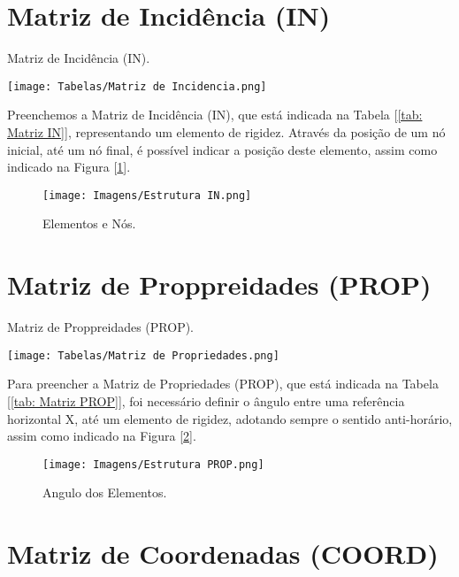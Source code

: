 \documentclass[deposito, acronym, symbols]{fei}
\begin{document}
\section{Matriz de Incidência (IN)}

\begin{table}[!htb]
 \centering
    \caption{Matriz de Incidência (IN).}
    \texttt{[image: Tabelas/Matriz de Incidencia.png]}
    \label{tab: Matriz IN}
 \end{table}
 
Preenchemos a Matriz de Incidência (IN), que está indicada na Tabela [\ref{tab: Matriz IN}], representando um elemento de rigidez. Através da posição de um nó inicial, até um nó final, é possível indicar a posição deste elemento, assim como indicado na Figura [\ref{fig: Estrutura IN}].

\begin{figure}[!htb]
 \centering
    \caption{Elementos e Nós.}
    \texttt{[image: Imagens/Estrutura IN.png]}
    \label{fig: Estrutura IN}
 \end{figure}
 
\section{Matriz de Proppreidades (PROP)}

\begin{table}[!htb]
 \centering
    \caption{Matriz de Proppreidades (PROP).}
    \texttt{[image: Tabelas/Matriz de Propriedades.png]}
    \label{tab: Matriz PROP}
 \end{table}

Para preencher a Matriz de Propriedades (PROP), que está indicada na Tabela [\ref{tab: Matriz PROP}], foi necessário definir o ângulo entre uma referência horizontal X, até um elemento de rigidez, adotando sempre o sentido anti-horário, assim como indicado na Figura [\ref{fig: Estrutura PROP}].

\begin{figure}[!htb]
 \centering
    \caption{Angulo dos Elementos.}
    \texttt{[image: Imagens/Estrutura PROP.png]}
    \label{fig: Estrutura PROP}
 \end{figure}
 
\section{Matriz de Coordenadas (COORD)}
\end{document}
